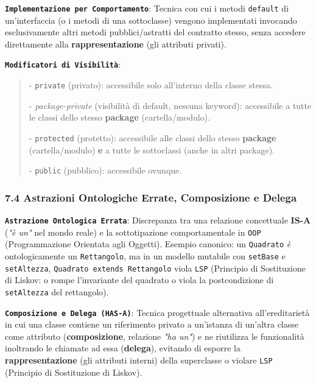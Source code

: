 \textbf{\texttt{Implementazione per Comportamento}}: Tecnica con cui i metodi \texttt{default} di un'interfaccia (o i metodi di una sottoclasse) vengono implementati invocando esclusivamente altri metodi pubblici/astratti del contratto stesso, senza accedere direttamente alla \textbf{rappresentazione} (gli attributi privati).

\textbf{\texttt{Modificatori di Visibilità}}:

\begin{quote}\small

- \texttt{private} (privato): accessibile solo all'interno della classe stessa.

- \emph{package-private} (visibilità di default, nessuna keyword): accessibile a tutte le classi dello stesso \textbf{package} (cartella/modulo).

- \texttt{protected} (protetto): accessibile alle classi dello stesso \textbf{package} (cartella/modulo) \textbf{e} a tutte le sottoclassi (anche in altri package).

- \texttt{public} (pubblico): accessibile ovunque.

\end{quote}

\subsubsection{7.4 Astrazioni Ontologiche Errate, Composizione e Delega}\label{7-4-astrazioni-ontologiche-errate-composizione-e-delega}

\textbf{\texttt{Astrazione Ontologica Errata}}: Discrepanza tra una relazione concettuale \textbf{IS-A} (\emph{"è un"} nel mondo reale) e la sottotipazione comportamentale in \texttt{OOP} (Programmazione Orientata agli Oggetti). Esempio canonico: un \texttt{Quadrato} \emph{è} ontologicamente un \texttt{Rettangolo}, ma in un modello mutabile con \texttt{setBase} e \texttt{setAltezza}, \texttt{Quadrato extends Rettangolo} viola \texttt{LSP} (Principio di Sostituzione di Liskov: o rompe l'invariante del quadrato o viola la postcondizione di \texttt{setAltezza} del rettangolo).

\textbf{\texttt{Composizione e Delega (HAS-A)}}: Tecnica progettuale alternativa all'ereditarietà in cui una classe contiene un riferimento privato a un'istanza di un'altra classe come attributo (\textbf{composizione}, relazione \emph{"ha un"}) e ne riutilizza le funzionalità inoltrando le chiamate ad essa (\textbf{delega}), evitando di esporre la \textbf{rappresentazione} (gli attributi interni) della superclasse o violare \texttt{LSP} (Principio di Sostituzione di Liskov).

